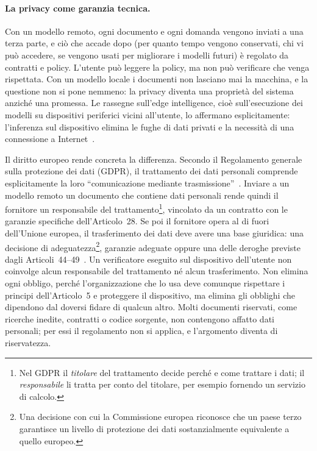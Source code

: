 \paragraph{La privacy come garanzia tecnica.} Con un modello remoto, ogni documento e ogni domanda vengono inviati a una
terza parte, e ciò che accade dopo (per quanto tempo vengono conservati, chi vi può accedere, se vengono usati per
migliorare i modelli futuri) è regolato da contratti e policy. L'utente può leggere la policy, ma non può verificare che
venga rispettata. Con un modello locale i documenti non lasciano mai la macchina, e la questione non si pone nemmeno: la
privacy diventa una proprietà del sistema anziché una promessa. Le rassegne sull'edge intelligence, cioè sull'esecuzione dei modelli su dispositivi
periferici vicini all'utente, lo affermano esplicitamente: l'inferenza sul dispositivo elimina le fughe di dati privati e la necessità di una connessione a
Internet~\cite{qu2025mobileedge}.

Il diritto europeo rende concreta la differenza. Secondo il Regolamento generale sulla protezione dei dati (GDPR), il
trattamento dei dati personali comprende esplicitamente la loro ``comunicazione mediante trasmissione''~\cite[Art.~4(2)]{gdpr2016}.
Inviare a un modello remoto un documento che contiene dati personali rende quindi il fornitore un responsabile del
trattamento\footnote{Nel GDPR il \emph{titolare} del trattamento decide perché e come trattare i dati; il
\emph{responsabile} li tratta per conto del titolare, per esempio fornendo un servizio di calcolo.}, vincolato da un
contratto con le garanzie specifiche dell'Articolo~28. Se poi il fornitore opera al di fuori dell'Unione europea, il
trasferimento dei dati deve avere una base giuridica: una decisione di adeguatezza\footnote{Una decisione con cui la
Commissione europea riconosce che un paese terzo garantisce un livello di protezione dei dati sostanzialmente
equivalente a quello europeo.}, garanzie adeguate oppure una delle deroghe previste dagli
Articoli~44--49~\cite{gdpr2016}. Un verificatore eseguito sul dispositivo dell'utente non coinvolge alcun
responsabile del trattamento né alcun trasferimento. Non elimina ogni obbligo, perché l'organizzazione che lo usa deve
comunque rispettare i principi dell'Articolo~5 e proteggere il dispositivo, ma elimina gli obblighi che dipendono dal
doversi fidare di qualcun altro. Molti documenti riservati, come ricerche inedite, contratti o codice sorgente, non
contengono affatto dati personali; per essi il regolamento non si applica, e l'argomento diventa di riservatezza.

